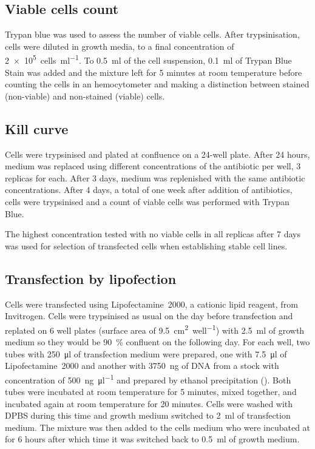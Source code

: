     \subsection{Viable cells count}
      Trypan blue was used to assess the number of viable cells.
      After trypsinisation, cells were diluted in growth media,
      to a final concentration of \SI{2e5}{cells\per\ml}.
      To \SI{0.5}{\ml} of the cell suspension, \SI{0.1}{\ml} of 
      Trypan Blue Stain was added and the mixture left for 5 minutes
      at room temperature before counting
      the cells in an hemocytometer and making a distinction between
      stained (non-viable) and non-stained (viable) cells.

    \subsection{Kill curve}
      \label{sec:methods:kill-curve}
      Cells were trypsinised and plated at  confluence on
      a 24-well plate. After 24 hours, medium was replaced using different
      concentrations of the antibiotic per well, 3 replicas for each.
      After 3 days, medium was replenished
      with the same antibiotic concentrations. After 4 days, a total of
      one week after addition of antibiotics, cells were trypsinised and a count
      of viable cells was performed with
      Trypan Blue.

      The highest concentration tested with no viable cells in all
      replicas after 7 days was used for selection of transfected
      cells when establishing stable cell lines.

    \subsection{Transfection by lipofection}
      \label{methods:lipofection}
      Cells were transfected using Lipofectamine~2000, a cationic lipid
      reagent, from Invitrogen. Cells were trypsinised as usual on the
      day before transfection and replated on 6 well plates (surface area
      of \SI{9.5}{\square\cm\per well}) with \SI{2.5}{\ml} of growth
      medium so they would be \SI{90}{\percent} confluent on the following
      day. For each well, two tubes with \SI{250}{\ul} of transfection
      medium were prepared, one with \SI{7.5}{\ul} of Lipofectamine~2000
      and another with \SI{3750}{\ng} of DNA from a stock with concentration
      of \SI{500}{\ng\per\ul} and prepared by ethanol precipitation
      ().
      Both tubes were incubated at room temperature for 5 minutes,
      mixed together, and incubated again at room temperature for 20 minutes. Cells
      were washed with DPBS during this time and growth medium switched to \SI{2}{\ml}
      of transfection medium. The mixture was then added to the cells medium who
      were incubated at  for 6 hours after which time it was switched back to
      \SI{0.5}{\ml} of growth medium.

